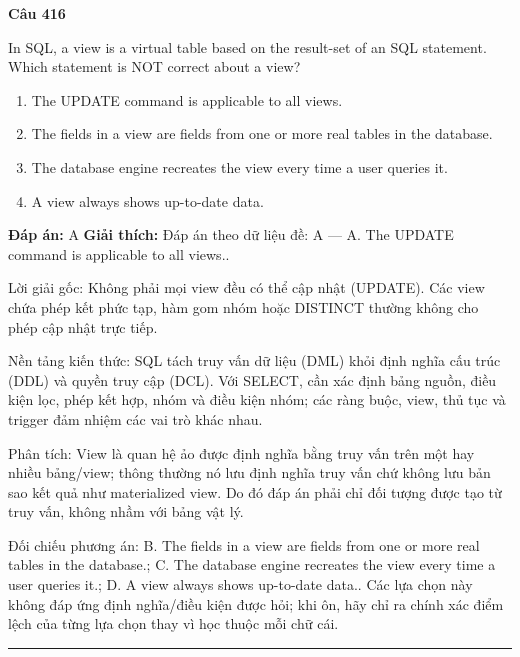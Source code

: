 \documentclass[11pt,a4paper]{article}
\newenvironment{question}[1]{%
  \par\vspace{1em}\noindent\textbf{\large Câu #1}\par\vspace{0.4em}
}{%
  \par\vspace{1em}\hrule\vspace{0.6em}
}
\newenvironment{choices}{%
  \begin{enumerate}[label=\textbf{\Alph*.},leftmargin=2.2em,itemsep=2pt,topsep=3pt]
}{%
  \end{enumerate}
}
\newcommand{\choice}{\item}
\begin{document}
\begin{question}{416}
In SQL, a view is a virtual table based on the result-set of an SQL statement. Which statement is NOT correct about a view?
\begin{choices}
\choice The UPDATE command is applicable to all views.
\choice The fields in a view are fields from one or more real tables in the database.
\choice The database engine recreates the view every time a user queries it.
\choice A view always shows up-to-date data.
\end{choices}
\textbf{Đáp án:} A
\textbf{Giải thích:} Đáp án theo dữ liệu đề: A — A. The UPDATE command is applicable to all views..

Lời giải gốc: Không phải mọi view đều có thể cập nhật (UPDATE). Các view chứa phép kết phức tạp, hàm gom nhóm hoặc DISTINCT thường không cho phép cập nhật trực tiếp.

Nền tảng kiến thức: SQL tách truy vấn dữ liệu (DML) khỏi định nghĩa cấu trúc (DDL) và quyền truy cập (DCL). Với SELECT, cần xác định bảng nguồn, điều kiện lọc, phép kết hợp, nhóm và điều kiện nhóm; các ràng buộc, view, thủ tục và trigger đảm nhiệm các vai trò khác nhau.

Phân tích: View là quan hệ ảo được định nghĩa bằng truy vấn trên một hay nhiều bảng/view; thông thường nó lưu định nghĩa truy vấn chứ không lưu bản sao kết quả như materialized view. Do đó đáp án phải chỉ đối tượng được tạo từ truy vấn, không nhầm với bảng vật lý.

Đối chiếu phương án: B. The fields in a view are fields from one or more real tables in the database.; C. The database engine recreates the view every time a user queries it.; D. A view always shows up-to-date data.. Các lựa chọn này không đáp ứng định nghĩa/điều kiện được hỏi; khi ôn, hãy chỉ ra chính xác điểm lệch của từng lựa chọn thay vì học thuộc mỗi chữ cái.
\end{question}
\end{document}
